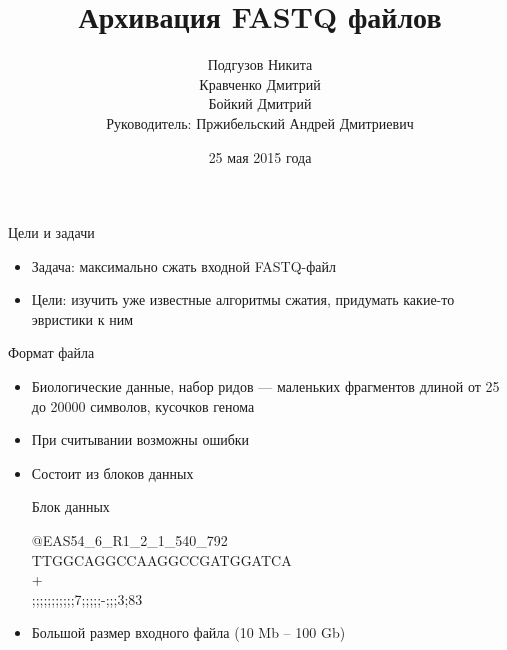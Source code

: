 \documentclass[12pt]{beamer}
\begin{document}
\title{Архивация FASTQ файлов}

\author[]{
    Подгузов Никита \\
    Кравченко Дмитрий \\
    Бойкий Дмитрий \\ 
    \vspace{\baselineskip}
    \footnotesize Руководитель: Пржибельский Андрей Дмитриевич
}
\date{25 мая 2015 года}

\frame{\titlepage}

\begin{frame}{Цели и задачи}

    \begin{itemize}

        \item <1-> Задача: максимально сжать входной FASTQ-файл
        
        \item <2-> Цели: изучить уже известные алгоритмы сжатия, придумать какие-то эвристики к ним

        \end{itemize}

\end{frame}

\begin{frame}{Формат файла}

    \begin{itemize}

        \item <1-> Биологические данные, набор ридов --- маленьких фрагментов длиной от 25 до 20000 символов, кусочков генома

        \item <2-> При считывании возможны ошибки

        \item <3-> Состоит из блоков данных

        \begin{block}{Блок данных}
    
            @EAS54{\_}6{\_}R1{\_}2{\_}1{\_}540{\_}792\\
            TTGGCAGGCCAAGGCCGATGGATCA\\
            + \\
            ;;;;;;;;;;;7;;;;;-;;;3;83 

        \end{block}
    
        \item <4-> Большой размер входного файла (10 Mb -- 100 Gb)

    \end{itemize}

\end{frame}
\end{document}
